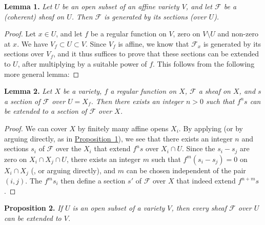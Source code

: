 \documentclass{article}
\newenvironment{itenv}[1]
  {\phantomsection\par\medskip\noindent\textbf{#1.}\itshape}
  {\par\medskip}
\newcommand{\scr}[1]{{\mathscr{#1}}}
\newcommand{\oldpage}[1]{\marginpar{\footnotesize$\Big\vert$ \textit{p.~#1}}}
\begin{document}
\begin{itenv}{Lemma 1}
\label{lemma1}
  Let $U$ be an open subset of an affine variety $V$, and let $\scr{F}$ be a (coherent) sheaf on $U$.
  Then $\scr{F}$ is generated by its sections (over $U$).
\end{itenv}

\begin{proof}
  Let $x\in U$, and let $f$ be a regular function on $V$, zero on $V\setminus U$ and non-zero at $x$.
  We have $V_f\subset U\subset V$.
  Since $V_f$ is affine, we know \cite{12} that $\scr{F}_x$ is generated by its sections over $V_f$, and it thus suffices to prove that these sections can be extended to $U$, after multiplying by a suitable power of $f$.
  This follows from the following more general lemma:
\end{proof}

\begin{itenv}{Lemma 2}
\label{lemma2}
  Let $X$ be a variety, $f$ a regular function on $X$, $\scr{F}$ a sheaf on $X$, and $s$ a section of $\scr{F}$ over $U=X_f$.
  Then there exists an integer $n>0$ such that $f^ns$ can be extended to a section of $\scr{F}$ over $X$.
\end{itenv}

\begin{proof}
  We can cover $X$ by finitely many affine opens $X_i$.
  By applying \cite[lemma~1, p.~247]{12} (or by arguing directly, as in \hyperref[proposition1]{Proposition~1}), we see that there exists an integer $n$ and sections $s_i$ of $\scr{F}$ over the $X_i$ that extend $f^ns$ over $X_i\cap U$.
  Since the $s_i-s_j$ are zero on $X_i\cap X_j\cap U$, there exists an integer $m$ such that $f^m(s_i-s_j)=0$ on $X_i\cap X_j$ (\cite[p.~235]{12}, or arguing directly), and $m$ can be chosen independent of the pair $(i,j)$.
  The $f^ms_i$ then define a section $s'$ of $\scr{F}$ over $X$ that indeed extend $f^{n+m}s$.
\end{proof}

\begin{itenv}{Proposition 2}
\label{proposition2}
\oldpage{99}
  If $U$ is an open subset of a variety $V$, then every sheaf $\scr{F}$ over $U$ can be extended to $V$.
\end{itenv}
\end{document}
